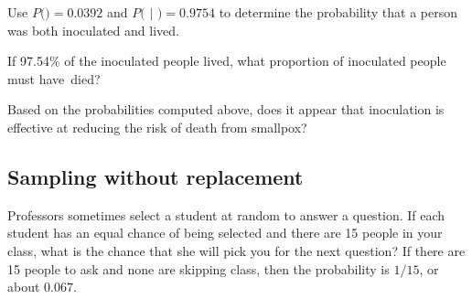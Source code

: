 \begin{exercisewrap}
\begin{nexercise}
Use $P($$) = 0.0392$ and $P($ $|$ $) = 0.9754$ to determine the probability that a person was both inoculated and lived.\footnotemark
\end{nexercise}
\end{exercisewrap}
\D{\vspace{-2mm}}

\begin{exercisewrap}
\begin{nexercise}
If 97.54\% of the inoculated people lived, what proportion of inoculated people must have~died?\footnotemark{}
\end{nexercise}
\end{exercisewrap}
\D{\vspace{-2mm}}

\begin{exercisewrap}
\begin{nexercise}
Based on the probabilities computed above, does it appear that inoculation is effective at reducing the risk of death from smallpox?\footnotemark
\end{nexercise}
\end{exercisewrap}


\D{\newpage}

\subsection{Sampling without replacement}
\label{smallPop}

\begin{examplewrap}
\begin{nexample}{Professors sometimes select a student at random to answer a question. If each student has an equal chance of being selected and there are 15 people in your class, what is the chance that she will pick you for the next question?}
If there are 15 people to ask and none are skipping class, then the probability is $1/15$, or about $0.067$.
\end{nexample}
\end{examplewrap}

